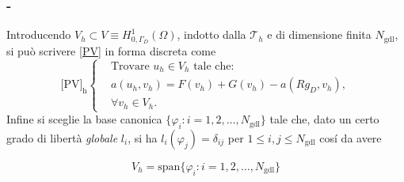\documentclass[11pt]{beamer}
\newcommand{\Ngdl}{N_{\text{gdl}}}
\newcommand{\SpaziaturaMate}[3]{
    \setlength{\thinmuskip}{#1mu}
    \setlength{\medmuskip}{#2mu}
    \setlength{\thickmuskip}{#3mu}
}
\newcommand{\teqref}[2]{\hyperref[#1]{#2}}
\begin{document}
            \begin{frame}\frametitle{\insertpart{} - \insertsection{}}
                {\SpaziaturaMate{1}{2}{3}
                Introducendo $V_h\subset V\equiv H^1_{0,\Gamma_D}(\Omega)$, indotto dalla $\mathcal T_h$ e di dimensione finita $\Ngdl$, si può scrivere \teqref{eqPSVariazionale}{[PV]} in forma discreta come
                \begin{equation}
                    \text{[PV]}_\text{h}
                    \left\{
                    \begin{aligned}
                        &\text{Trovare } u_h \in V_h \text{ tale che:}
                        \\[5pt]&a(u_h,v_h)=F(v_h)+G(v_h)-a(Rg_D,v_h),
                        \\[5pt]&\forall v_h\in V_h.
                    \end{aligned}
                    \right.
                    \label{eqPSVariazionaleDiscreto}
                \end{equation}
                Infine si sceglie la base canonica $\{\varphi_i\colon i=1,2,\ldots,\Ngdl\}$ tale che, dato un certo grado di libertà \textit{globale} $l_i$, si ha $l_i(\varphi_j)=\delta_{ij}$ per $1\le i,j\le \Ngdl$ cosí da avere
                }
                \begin{equation*}
                    V_h=\text{span}\{\varphi_i\colon i=1,2,\ldots,\Ngdl\}
                \end{equation*}
            \end{frame}
\end{document}
